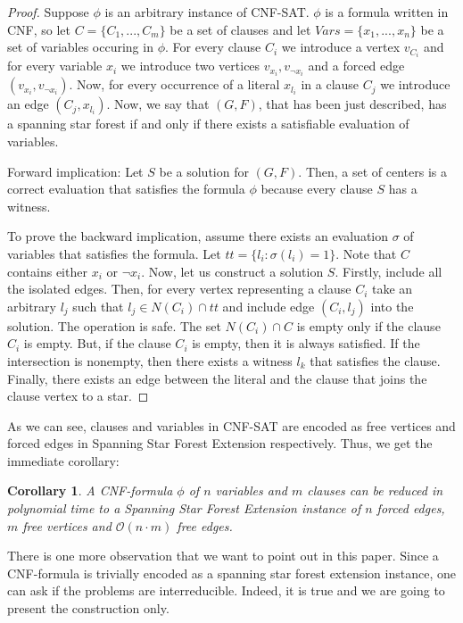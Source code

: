 \documentclass[en]{pracamgr}
\newtheorem{corollary}{Corollary}
\newcommand{\ssfep}{{\sc Spanning Star Forest Extension}}
\newcommand{\cnfsat}{{\sc CNF-SAT}}
\begin{document}
\begin{proof}
	Suppose $\phi$ is an arbitrary instance of \cnfsat{}. $\phi$ is a formula written in CNF, so let $C=\{C_1,...,C_m\}$ be a set of clauses and let $Vars=\{x_1,...,x_n\}$ be a set of variables occuring in $\phi$. For every clause $C_i$ we introduce a vertex $v_{C_i}$ and for every variable $x_i$ we introduce two vertices $v_{x_i},v_{\neg x_i}$ and a forced edge $(v_{x_i}, v_{\neg x_i})$. Now, for every occurrence of a literal $x_{l_i}$ in a clause $C_j$ we introduce an edge $(C_j, x_{l_i})$. Now, we say that $(G,F)$, that has been just described, has a spanning star forest if and only if there exists a satisfiable evaluation of variables.
	
	Forward implication: Let $S$ be a solution for $(G,F)$. Then, a set of centers is a correct evaluation that satisfies the formula $\phi$ because every clause $S$ has a witness.
	
	To prove the backward implication, assume there exists an evaluation $\sigma$ of variables that satisfies the formula. Let $tt = \{l_i: \sigma(l_i) = 1\} $. Note that $C$ contains either $x_i$ or $\neg x_i$. Now, let us construct a solution $S$. Firstly, include all the isolated edges. Then, for every vertex representing a clause $C_i$ take an arbitrary $l_j$ such that $l_j \in N(C_i) \cap tt$ and include edge $(C_i, l_j)$ into the solution. The operation is safe. The set $ N(C_i) \cap C$ is empty only if the clause $C_i$ is empty. But, if the clause $C_i$ is empty, then it is always satisfied. If the intersection is nonempty, then there exists a witness $l_k$ that satisfies the clause. Finally, there exists an edge between the literal and the clause that joins the clause vertex to a star.
	
\end{proof}

As we can see, clauses and variables in \cnfsat{} are encoded as free vertices and forced edges in \ssfep{} respectively. Thus, we get the immediate corollary:

\begin{corollary}\label{ssfep size}
	A CNF-formula $\phi$ of $n$ variables and $m$ clauses can be reduced in polynomial time to a \ssfep{} instance of $n$ forced edges, $m$ free vertices and $\mathcal{O}(n\cdot m)$ free edges.
\end{corollary}

There is one more observation that we want to point out in this paper. Since a CNF-formula is trivially encoded as a spanning star forest extension instance, one can ask if the problems are interreducible. Indeed, it is true and we are going to present the construction only.
\end{document}
